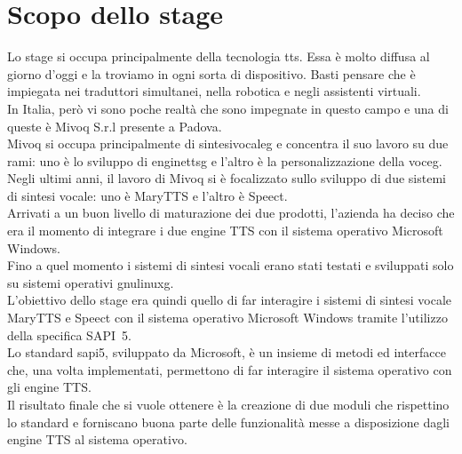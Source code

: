 \section{Scopo dello stage}
Lo stage si occupa principalmente della tecnologia \gls{tts}. Essa è molto diffusa al giorno d'oggi e la troviamo in ogni sorta di dispositivo. Basti pensare che è impiegata nei traduttori simultanei, nella robotica e negli assistenti virtuali.\\ 
In Italia, però vi sono poche realtà che sono impegnate in questo campo e una di queste è Mivoq S.r.l presente a Padova.\\
Mivoq si occupa principalmente di \gls{sintesivocaleg} e concentra il suo lavoro su due rami:  uno è lo sviluppo di \gls{enginettsg} e l'altro è la personalizzazione della \gls{voceg}.\\
Negli ultimi anni, il lavoro di Mivoq si è focalizzato sullo sviluppo di due sistemi di sintesi vocale: uno è MaryTTS e l'altro è Speect.\\
Arrivati a un buon livello di maturazione dei due prodotti, l'azienda ha deciso che era il momento di integrare i due engine TTS con il sistema operativo Microsoft Windows.\\
Fino a quel momento i sistemi di sintesi vocali erano stati testati e sviluppati solo su sistemi operativi \gls{gnulinuxg}.\\
L'obiettivo dello stage era quindi quello di far interagire i sistemi di sintesi vocale MaryTTS e Speect con il sistema operativo Microsoft Windows tramite l'utilizzo della specifica SAPI~5.\\
Lo standard \gls{sapi5}, sviluppato da Microsoft, è un insieme di metodi ed interfacce che, una volta implementati, permettono di far interagire il sistema operativo con gli engine TTS.\\
Il risultato finale che si vuole ottenere è la creazione di due moduli che rispettino lo standard e forniscano buona parte delle funzionalità messe a disposizione dagli engine TTS al sistema operativo.

